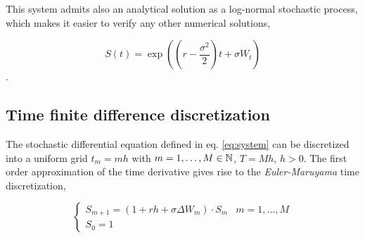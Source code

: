 
This system admits also an analytical solution as a log-normal stochastic process, which makes it easier to verify any other numerical solutions,

\begin{equation}\label{eq:system_analytical}
S(t) = \exp \left( (r - \frac{\sigma^2}{2})t + \sigma W_t \right)
\end{equation}.

\subsection{Time finite difference discretization}

The stochastic differential equation defined in eq. \ref{eq:system} can be discretized into a uniform grid $t_m = m h$ with $m = 1,\dots,M \in \mathbb{N}$, $T = Mh$, $h > 0$.
The first order approximation of the time derivative gives rise to the \textit{Euler-Maruyama} time discretization,

\begin{equation}\label{eq:EM}
\begin{cases}
    S_{m+1} = (1 + r h + \sigma \Delta W_m) \cdot S_m  & m = 1,\dots,M\\
    S_0 = 1
\end{cases}
\end{equation}


